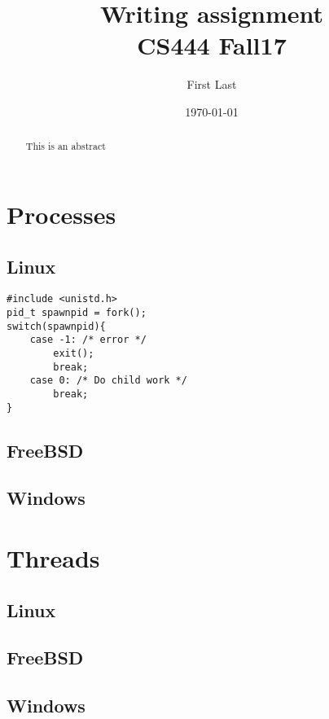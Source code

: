 \documentclass[onecolumn, draftclsnofoot,10pt, compsoc]{IEEEtran}
\title{Writing assignment\\\large CS444 Fall17}
\author{First Last}
\date{\today}
\begin{document}
\begin{titlingpage}
			\maketitle
      \begin{abstract}
			\noindent This is an abstract
      \end{abstract}
\end{titlingpage}

\newpage
{}

\clearpage
\singlespace



\section*{Processes}
\subsection*{Linux}

\begin{lstlisting}
#include <unistd.h>
pid_t spawnpid = fork();
switch(spawnpid){
	case -1: /* error */
		exit();
		break;
	case 0: /* Do child work */
		break;
}
\end{lstlisting}

\subsection*{FreeBSD}


\subsection*{Windows}

\section*{Threads}
\subsection*{Linux}


\subsection*{FreeBSD}

\subsection*{Windows}
\end{document}
